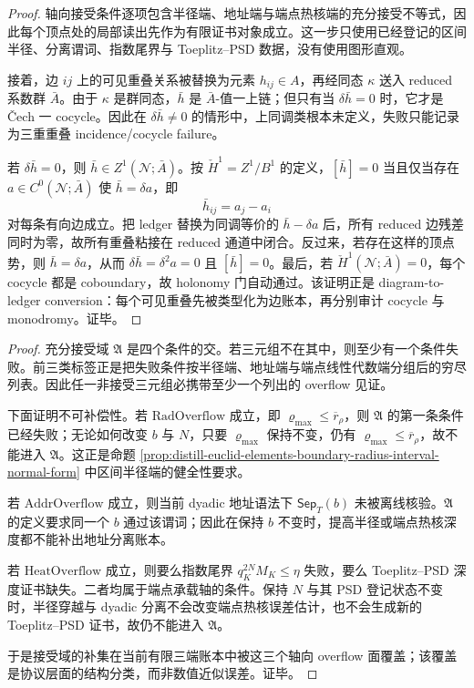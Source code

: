 \begin{proof}
轴向接受条件逐项包含半径端、地址端与端点热核端的充分接受不等式，因此每个顶点处的局部读出先作为有限证书对象成立。这一步只使用已经登记的区间半径、分离谓词、指数尾界与 Toeplitz--PSD 数据，没有使用图形直观。

接着，边 \(ij\) 上的可见重叠关系被替换为元素 \(h_{ij}\in A\)，再经同态 \(\kappa\) 送入 reduced 系数群 \(\bar A\)。由于 \(\kappa\) 是群同态，\(\bar h\) 是 \(\bar A\)-值一上链；但只有当 \(\delta\bar h=0\) 时，它才是 \v Cech 一 cocycle。因此在 \(\delta\bar h\ne0\) 的情形中，上同调类根本未定义，失败只能记录为三重重叠 incidence/cocycle failure。

若 \(\delta\bar h=0\)，则 \(\bar h\in Z^1(\mathcal N;\bar A)\)。按 \(\check H^1=Z^1/B^1\) 的定义，\([\bar h]=0\) 当且仅当存在 \(a\in C^0(\mathcal N;\bar A)\) 使 \(\bar h=\delta a\)，即
\[
\bar h_{ij}=a_j-a_i
\]
对每条有向边成立。把 ledger 替换为同调等价的 \(\bar h-\delta a\) 后，所有 reduced 边残差同时为零，故所有重叠粘接在 reduced 通道中闭合。反过来，若存在这样的顶点势，则 \(\bar h=\delta a\)，从而 \(\delta\bar h=\delta^2a=0\) 且 \([\bar h]=0\)。最后，若 \(\check H^1(\mathcal N;\bar A)=0\)，每个 cocycle 都是 coboundary，故 holonomy 门自动通过。该证明正是 diagram-to-ledger conversion：每个可见重叠先被类型化为边账本，再分别审计 cocycle 与 monodromy。证毕。
\end{proof}

\begin{proof}
充分接受域 \(\mathfrak A\) 是四个条件的交。若三元组不在其中，则至少有一个条件失败。前三类标签正是把失败条件按半径端、地址端与端点线性代数端分组后的穷尽列表。因此任一非接受三元组必携带至少一个列出的 overflow 见证。

下面证明不可补偿性。若 \(\mathrm{RadOverflow}\) 成立，即 \(\varrho_{\max}\le\overline r_\rho\)，则 \(\mathfrak A\) 的第一条条件已经失败；无论如何改变 \(b\) 与 \(N\)，只要 \(\varrho_{\max}\) 保持不变，仍有 \(\varrho_{\max}\le\overline r_\rho\)，故不能进入 \(\mathfrak A\)。这正是命题
\ref{prop:distill-euclid-elements-boundary-radius-interval-normal-form}
中区间半径端的健全性要求。

若 \(\mathrm{AddrOverflow}\) 成立，则当前 dyadic 地址语法下 \(\mathsf{Sep}_T(b)\) 未被离线核验。\(\mathfrak A\) 的定义要求同一个 \(b\) 通过该谓词；因此在保持 \(b\) 不变时，提高半径或端点热核深度都不能补出地址分离账本。

若 \(\mathrm{HeatOverflow}\) 成立，则要么指数尾界 \(q_K^{2N}M_K\le\eta\) 失败，要么 Toeplitz--PSD 深度证书缺失。二者均属于端点承载轴的条件。保持 \(N\) 与其 PSD 登记状态不变时，半径穿越与 dyadic 分离不会改变端点热核误差估计，也不会生成新的 Toeplitz--PSD 证书，故仍不能进入 \(\mathfrak A\)。

于是接受域的补集在当前有限三端账本中被这三个轴向 overflow 面覆盖；该覆盖是协议层面的结构分类，而非数值近似误差。证毕。
\end{proof}

